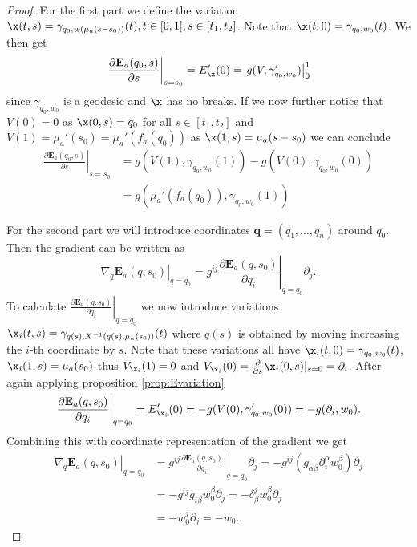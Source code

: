 \begin{proof}
For the first part we define the variation $\x(t,s) = \gamma_{q_0,w(\mu_a(s-s_0))}(t), t\in [0,1], s\in [t_1,t_2]$. Note that $\x(t,0)=\gamma_{q_0,w_0}(t)$. We then get
\begin{align*}
    \left.\frac{\partial\mathbf{E}_a(q_0,s)}{\partial s}\right\rvert_{s=s_0} = E'_{\x}(0) =  \left.g(V,\gamma_{q_0,w_0}')\right\rvert^1_0
\end{align*}
since $\gamma_{q_0,w_0}$ is a geodesic and $\x$ has no breaks. If we now further notice that $V(0)=0$ as $\x(0,s)=q_0$ for all $s\in[t_1,t_2]$ and $V(1) = \mu_a'(s_0) = \mu_a'(f_a(q_0))$ as $\x(1,s) = \mu_a(s-s_0)$ we can conclude 
\begin{align*}
    \left.\frac{\partial\mathbf{E}_a(q_0,s)}{\partial s}\right\rvert_{s=s_0} &= g(V(1),\gamma_{q_0,w_0}(1)) - g(V(0),\gamma_{q_0,w_0}(0))\\
    &= g(\mu_a'(f_a(q_0)),\gamma_{q_0,w_0}(1))
\end{align*}

For the second part we will introduce coordinates $\mathbf{q}=(q_1,\dots,q_n)$ around $q_0$. Then the gradient can be written as
\[
    \left.\nabla_q\mathbf{E}_a(q,s_0)\right\rvert_{q=q_0} = g^{ij}\left.\frac{\partial\mathbf{E}_a(q,s_0)}{\partial q_i}\right\rvert_{q=q_0}\partial_j.
\]
To calculate $\left.\frac{\partial\mathbf{E}_a(q,s_0)}{\partial q_i}\right\rvert_{q=q_0}$ we now introduce variations $\x_i(t,s) = \gamma_{q(s),X^{-1}(q(s),\mu_a(s_0))}(t)$ where $q(s)$ is obtained by moving increasing the $i$-th coordinate by $s$. Note that these variations all have $\x_i(t,0) = \gamma_{q_0,w_0}(t)$, $\x_i(1,s) = \mu_a(s_0)$ thus $V_{\x_i}(1)=0$ and $V_{\x_i}(0) = \frac{\partial}{\partial s}\x_i(0,s)\rvert_{s=0} = \partial_i$.
After again applying proposition \ref{prop:Evariation}
\[
    \left.\frac{\partial\mathbf{E}_a(q,s_0)}{\partial q_i}\right\rvert_{q=q_0} = E'_{\x_i}(0) =  -g(V(0),\gamma'_{q_0,w_0}(0)) = -g(\partial_i,w_0).
\]
Combining this with coordinate representation of the gradient we get
\begin{align*}
    \left.\nabla_q\mathbf{E}_a(q,s_0)\right\rvert_{q=q_0} &= g^{ij}\left.\frac{\partial\mathbf{E}_a(q,s_0)}{\partial q_i}\right\rvert_{q=q_0}\partial_j = -g^{ij}(g_{\alpha\beta}\partial_i^\alpha w_0^\beta)\partial_j\\
    &= -g^{ij}g_{i\beta}w_0^\beta\partial_j = -\delta^j_\beta w_0^\beta \partial_j\\
    &= -w_0^j\partial_j = -w_0.
\end{align*}


\end{proof}
